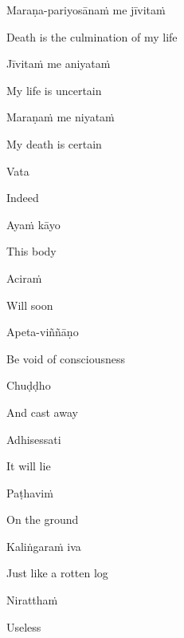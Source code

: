 Maraṇa-pariyosānaṁ me jīvitaṁ

\begin{english}
  Death is the culmination of my life
\end{english}

Jīvitaṁ me aniyataṁ

\begin{english}
  My life is uncertain
\end{english}

Maraṇaṁ me niyataṁ

\begin{english}
  My death is certain
\end{english}

\suttaRef{[Dhp A]}

Vata

\begin{english}
  Indeed
\end{english}

Ayaṁ kāyo

\begin{english}
  This body
\end{english}

Aciraṁ

\begin{english}
  Will soon
\end{english}

Apeta-viññāṇo

\begin{english}
  Be void of consciousness
\end{english}

Chuḍḍho

\begin{english}
  And cast away
\end{english}

Adhisessati

\begin{english}
  It will lie
\end{english}

Paṭhaviṁ

\begin{english}
  On the ground
\end{english}

Kaliṅgaraṁ iva

\begin{english}
  Just like a rotten log
\end{english}

Niratthaṁ

\begin{english}
  Useless
\end{english}


